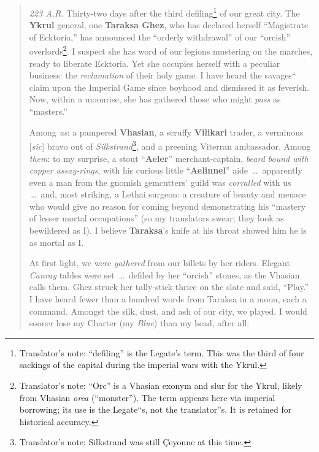 \documentclass[11pt]{article}
\begin{document}
\begin{quote}\small
\textit{223 A.R.} Thirty-two days after the third defiling\footnote{Translator's note: ``defiling'' is the Legate's term. This was the third of four sackings of the capital during the imperial wars with the Ykrul.} of our great city. The \textbf{Ykrul} general, one \textbf{Taraksa Ghez}, who has declared herself ``Magistrate of Ecktoria,'' has announced the ``orderly withdrawal'' of our ``orcish'' overlords\footnote{Translator's note: ``Orc'' is a Vhasian exonym and slur for the Ykrul, likely from Vhasian \emph{orca} (``monster''). The term appears here via imperial borrowing; its use is the Legate``s, not the translator''s. It is retained for historical accuracy.}. I suspect she has word of our legions mustering on the marches, ready to liberate Ecktoria. Yet she occupies herself with a peculiar business: the \emph{reclamation} of their holy game. I have heard the savages`` claim upon the Imperial Game since boyhood and dismissed it as feverish. Now, within a moonrise, she has gathered those who might \emph{pass} as ``masters.''

Among \emph{us}: a pampered \textbf{Vhasian}, a scruffy \textbf{Vilikari} trader, a verminous [\emph{sic}] bravo out of \emph{Silkstrand}\footnote{Translator's note: Silkstrand was still \c{C}eyonne at this time.}, and a preening Viterran ambassador. Among \emph{them}: to my surprise, a stout ``\textbf{Aeler}'' merchant-captain, \emph{beard bound with copper assay-rings}, with his curious little ``\textbf{Aelinnel}'' aide \,\dots\ apparently even a man from the gnomish gemcutters' guild was \emph{corralled} with us \,\dots\ and, most striking, a Lethai surgeon: a creature of beauty and menace who would give no reason for coming beyond demonstrating his ``mastery of lesser mortal occupations'' (so my translators swear; they look as bewildered as I). I believe \textbf{Taraksa}'s knife at his throat showed him he is as mortal as I.

At first light, we were \emph{gathered} from our billets by her riders. Elegant \emph{Canray} tables were set \,\dots\ defiled by her ``orcish'' stones, as the Vhasian calls them. Ghez struck her tally-stick thrice on the slate and said, ``Play.'' I have heard fewer than a hundred words from Taraksa in a moon, each a command. Amongst the silk, dust, and ash of our city, we played. I would sooner lose my Charter (my \emph{Blue}) than my head, after all.
\end{quote}
\end{document}
